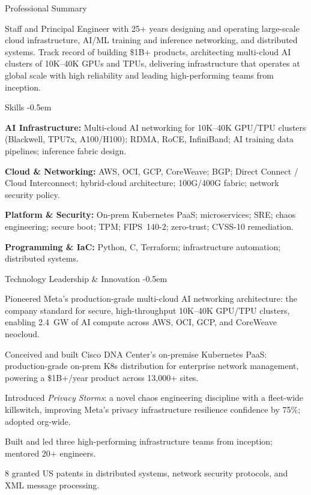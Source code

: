 \documentclass{resume}
\begin{document}

\begin{rSection}{Professional Summary}

Staff and Principal Engineer with 25+ years designing and operating large-scale cloud infrastructure,
AI/ML training and inference networking, and distributed systems. Track record of building \$1B+
products, architecting multi-cloud AI clusters of 10K--40K GPUs and TPUs, delivering infrastructure that operates at global scale with high reliability and leading
high-performing  teams from inception.

\begin{rSubsection}{Skills}{}{}{}
{\vspace{-2em}}
\itemsep -0.5em
\item \textbf{AI Infrastructure:} Multi-cloud AI networking for 10K--40K GPU/TPU clusters (Blackwell, TPU7x, A100/H100); RDMA, RoCE, InfiniBand; AI training data pipelines; inference fabric design.
\item \textbf{Cloud \& Networking:} AWS, OCI, GCP, CoreWeave; BGP; Direct Connect / Cloud Interconnect; hybrid-cloud architecture; 100G/400G fabric; network security policy.
\item \textbf{Platform \& Security:} On-prem Kubernetes PaaS; microservices; SRE; chaos engineering; secure boot; TPM; FIPS~140-2; zero-trust; CVSS-10 remediation.
\item \textbf{Programming \& IaC:} Python, C, Terraform; infrastructure automation; distributed systems.
\end{rSubsection}

\vspace{-.25em}

\begin{rSubsection}{Technology Leadership \& Innovation}{}{}{}
{\vspace{-2em}}\itemsep -0.5em
\item Pioneered Meta's production-grade multi-cloud AI networking architecture: the company standard for secure, high-throughput 10K--40K GPU/TPU clusters, enabling 2.4~GW of AI compute across AWS, OCI, GCP, and CoreWeave neocloud.
\item Conceived and built Cisco DNA Center's on-premise Kubernetes PaaS: production-grade on-prem K8s distribution for enterprise network management, powering a \$1B+/year product across 13,000+ sites.
\item Introduced \textit{Privacy Storms}: a novel chaos engineering discipline with a fleet-wide killswitch, improving Meta's privacy infrastructure resilience confidence by 75\%; adopted org-wide.
\item Built and led three high-performing infrastructure teams from inception; mentored 20+ engineers.
\item 8 granted US patents in distributed systems, network security protocols, and XML message processing.
\end{rSubsection}

\end{rSection}
\end{document}
